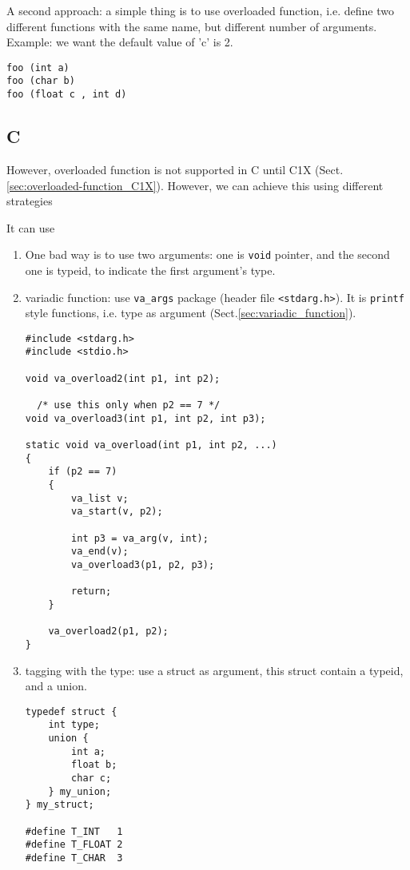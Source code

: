 A second approach: a simple thing is to use overloaded function, i.e. define two
different functions with the same name, but different number of arguments. Example: we
want the default value of 'c' is 2.
\begin{verbatim}
foo (int a)  
foo (char b)  
foo (float c , int d)
\end{verbatim} 


 \subsection{C}

However, overloaded function is not supported in C until C1X
(Sect.\ref{sec:overloaded-function_C1X}). However, we can achieve this using
different strategies

It can use
\begin{enumerate}  
  \item One bad way is to use two arguments: one is \verb!void! pointer, and the second
one is typeid, to indicate the first argument's type. 
   
  \item variadic function: use \verb!va_args! package (header file
  \verb!<stdarg.h>!). It is \verb!printf! style functions, i.e. type as
  argument (Sect.\ref{sec:variadic_function}).
  
\begin{verbatim}
#include <stdarg.h>
#include <stdio.h>

void va_overload2(int p1, int p2);
  
  /* use this only when p2 == 7 */
void va_overload3(int p1, int p2, int p3);

static void va_overload(int p1, int p2, ...)
{
	if (p2 == 7)
	{
		va_list v;
		va_start(v, p2);
		
		int p3 = va_arg(v, int);
		va_end(v);
		va_overload3(p1, p2, p3);
		
		return;
	}

	va_overload2(p1, p2);
}
\end{verbatim}

  
  \item tagging with the type: use a struct as argument, this struct contain a
  typeid, and a union.
\begin{verbatim}
typedef struct {
    int type;
    union {
    	int a; 
    	float b; 
    	char c;
    } my_union;
} my_struct;

#define T_INT   1
#define T_FLOAT 2
#define T_CHAR  3


\end{verbatim}
\end{enumerate}
